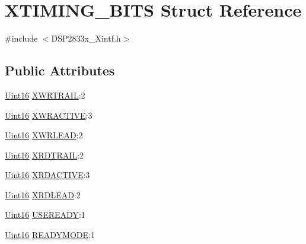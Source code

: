\hypertarget{struct_x_t_i_m_i_n_g___b_i_t_s}{}\section{X\+T\+I\+M\+I\+N\+G\+\_\+\+B\+I\+T\+S Struct Reference}
\label{struct_x_t_i_m_i_n_g___b_i_t_s}


{\ttfamily \#include $<$D\+S\+P2833x\+\_\+\+Xintf.\+h$>$}

\subsection*{Public Attributes}
\begin{DoxyCompactItemize}
\item 
\hyperlink{_d_s_p2833x___device_8h_a59a9f6be4562c327cbfb4f7e8e18f08b}{Uint16} \hyperlink{struct_x_t_i_m_i_n_g___b_i_t_s_a5caf499f9738f7b50ac2c6dadcf6763a}{X\+W\+R\+T\+R\+A\+I\+L}\+:2
\item 
\hyperlink{_d_s_p2833x___device_8h_a59a9f6be4562c327cbfb4f7e8e18f08b}{Uint16} \hyperlink{struct_x_t_i_m_i_n_g___b_i_t_s_a865db5b0fcc4e2a37833447d40b7650c}{X\+W\+R\+A\+C\+T\+I\+V\+E}\+:3
\item 
\hyperlink{_d_s_p2833x___device_8h_a59a9f6be4562c327cbfb4f7e8e18f08b}{Uint16} \hyperlink{struct_x_t_i_m_i_n_g___b_i_t_s_a6c6c7def2ffe2bf0b1ac1848e2c8fab4}{X\+W\+R\+L\+E\+A\+D}\+:2
\item 
\hyperlink{_d_s_p2833x___device_8h_a59a9f6be4562c327cbfb4f7e8e18f08b}{Uint16} \hyperlink{struct_x_t_i_m_i_n_g___b_i_t_s_aeec8f1bf94bdb8a5b9951fe4e27249cb}{X\+R\+D\+T\+R\+A\+I\+L}\+:2
\item 
\hyperlink{_d_s_p2833x___device_8h_a59a9f6be4562c327cbfb4f7e8e18f08b}{Uint16} \hyperlink{struct_x_t_i_m_i_n_g___b_i_t_s_a3b41af4a435f4025abd1e218afff6148}{X\+R\+D\+A\+C\+T\+I\+V\+E}\+:3
\item 
\hyperlink{_d_s_p2833x___device_8h_a59a9f6be4562c327cbfb4f7e8e18f08b}{Uint16} \hyperlink{struct_x_t_i_m_i_n_g___b_i_t_s_a83a135b6f84838a8a394666b661f9f45}{X\+R\+D\+L\+E\+A\+D}\+:2
\item 
\hyperlink{_d_s_p2833x___device_8h_a59a9f6be4562c327cbfb4f7e8e18f08b}{Uint16} \hyperlink{struct_x_t_i_m_i_n_g___b_i_t_s_a61f45a3bc106d45554e6e39fbe6420e3}{U\+S\+E\+R\+E\+A\+D\+Y}\+:1
\item 
\hyperlink{_d_s_p2833x___device_8h_a59a9f6be4562c327cbfb4f7e8e18f08b}{Uint16} \hyperlink{struct_x_t_i_m_i_n_g___b_i_t_s_a3ee07928af2eaa2b769adaa0158ed78e}{R\+E\+A\+D\+Y\+M\+O\+D\+E}\+:1

\end{DoxyCompactItemize}

